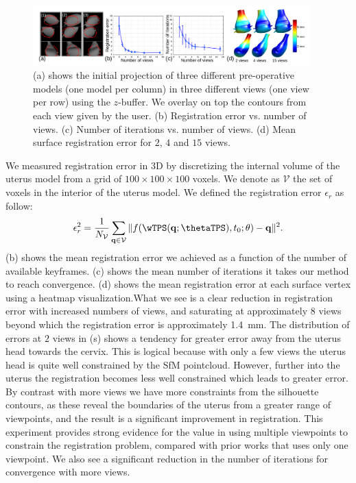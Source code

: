 \begin{figure}[htbp]
  \centering
  \includegraphics[width=0.95\textwidth]{./figs/errors.pdf}
\caption{(a) shows the initial projection of three different pre-operative models (one model per column) in three different views (one view per row) using the $z$-buffer. We overlay on top the contours from each view given by the user. (b) Registration error vs. number of views. (c) Number of iterations vs. number of views. (d) Mean surface registration error for $2$, $4$ and $15$ views.}
\label{fig:results}
\end{figure}


We measured registration error in 3D by discretizing the internal volume of the uterus model from a grid of $100\times 100 \times 100$ voxels. We denote as $\mathcal{V}$ the set of voxels in the interior of the uterus model. We defined the registration error $\epsilon_r$ as follow:
\begin{equation}
  \label{eq:regerror}
  \epsilon^2_r=\frac{1}{N_{\mathcal{V}}}\sum_{\mathbf{q}\in \mathcal{V}} \|f(\wTPS(\mathbf{q};\thetaTPS),t_0;\theta)-\mathbf{q}\|^2. 
\end{equation}
\noindent {}(b) shows the mean registration error we achieved as a function of the number of available keyframes. (c) shows the mean number of iterations it takes our method to reach convergence. (d) shows the mean registration error at each surface vertex using a heatmap visualization.What we see is a clear reduction in registration error with increased numbers of views, and saturating at approximately $8$ views beyond which the registration error is approximately \SI{1.4}{\milli\metre}. The distribution of errors at $2$ views in (s) shows a tendency for greater error away from the uterus head towards the cervix. This is logical because with only a few views the uterus head is quite well constrained by the SfM pointcloud. However, further into the uterus the registration becomes less well constrained which leads to greater error.
By contrast with more views we have more constraints from the silhouette contours, as these reveal the boundaries of the uterus from a greater range of viewpoints, and the result is a significant improvement in registration. This experiment provides strong evidence for the value in using multiple viewpoints to constrain the registration problem, compared with prior works that uses only one viewpoint. We also see a significant reduction in the number of iterations for convergence with more views.


